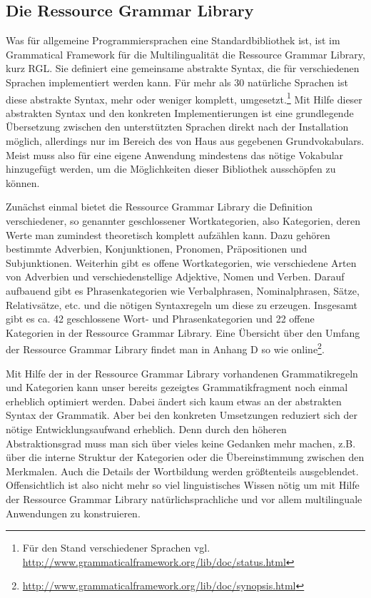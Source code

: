 \subsection{Die Ressource Grammar Library}
\label{subsec:rgl}
Was für allgemeine Programmiersprachen eine Standardbibliothek ist, ist im Grammatical Framework für die Multilingualität die Ressource Grammar Library, kurz RGL. Sie definiert eine gemeinsame abstrakte Syntax, die für verschiedenen Sprachen implementiert werden kann. Für mehr als 30 natürliche Sprachen ist diese abstrakte Syntax, mehr oder weniger komplett, umgesetzt.\footnote{Für den Stand verschiedener Sprachen vgl. \url{http://www.grammaticalframework.org/lib/doc/status.html}} Mit Hilfe dieser abstrakten Syntax und den konkreten Implementierungen ist eine grundlegende Übersetzung zwischen den unterstützten Sprachen direkt nach der Installation möglich, allerdings nur im Bereich des von Haus aus gegebenen Grundvokabulars. Meist muss also für eine eigene Anwendung mindestens das nötige Vokabular hinzugefügt werden, um die Möglichkeiten dieser Bibliothek ausschöpfen zu können. \par
Zunächst einmal bietet die Ressource Grammar Library die Definition verschiedener, so genannter geschlossener Wortkategorien, also Kategorien, deren Werte man zumindest theoretisch komplett aufzählen kann. Dazu gehören bestimmte Adverbien, Konjunktionen, Pronomen, Präpositionen und Subjunktionen. Weiterhin gibt es offene Wortkategorien, wie verschiedene Arten von Adverbien und verschiedenstellige Adjektive, Nomen und Verben. Darauf aufbauend gibt es Phrasenkategorien wie Verbalphrasen, Nominalphrasen, Sätze, Relativsätze, etc. und die nötigen Syntaxregeln um diese zu erzeugen. Insgesamt gibt es ca. 42 geschlossene Wort- und Phrasenkategorien und 22 offene Kategorien in der Ressource Grammar Library. Eine Übersicht über den Umfang der Ressource Grammar Library findet man in \cite{RANTA2011} Anhang D so wie online\footnote{\url{http://www.grammaticalframework.org/lib/doc/synopsis.html}}. \par
Mit Hilfe der in der Ressource Grammar Library vorhandenen Grammatikregeln und Kategorien kann unser bereits gezeigtes Grammatikfragment noch einmal erheblich optimiert werden. Dabei ändert sich kaum etwas an der abstrakten Syntax der Grammatik. Aber bei den konkreten Umsetzungen reduziert sich der nötige Entwicklungsaufwand erheblich. Denn durch den höheren Abstraktionsgrad muss man sich über vieles keine Gedanken mehr machen, z.B. über die interne Struktur der Kategorien oder die Übereinstimmung zwischen den Merkmalen. Auch die Details der Wortbildung werden größtenteils ausgeblendet. Offensichtlich ist also nicht mehr so viel linguistisches Wissen nötig um mit Hilfe der Ressource Grammar Library natürlichsprachliche und vor allem multilinguale Anwendungen zu konstruieren. \par

